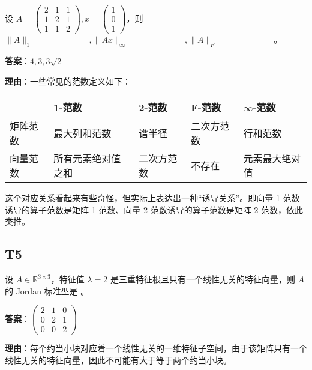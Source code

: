 \documentclass{article}
\begin{document}
\par 设 $A=\begin{pmatrix}
	2 & 1 & 1\\
	1 & 2 & 1\\
	1 & 1 & 2
\end{pmatrix}, x=\begin{pmatrix}
	1\\0\\1
\end{pmatrix}$，则 $\|A\|_1=\underline{\phantom{empty\_space}}, \|Ax\|_{\infty}=\underline{\phantom{empty\_space}}, \|A\|_F=\underline{\phantom{empty\_space}}$。

\par \textbf{答案}：$4, 3, 3\sqrt 2$

\par \textbf{理由}：一些常见的范数定义如下：

\begin{tabularx}{\linewidth}{|X|X|X|X|X|} 
	\hline
	 & 1-范数 & 2-范数 & F-范数 & $\infty$-范数 \\ 
	\hline
	矩阵范数 & 最大列和范数 & 谱半径 & 二次方范数 & 行和范数 \\ 
	\hline
	向量范数 & 所有元素绝对值之和 & 二次方范数 & 不存在 & 元素最大绝对值 \\ 
	\hline
\end{tabularx}

\par 这个对应关系看起来有些奇怪，但实际上表达出一种“诱导关系”。即向量 1-范数 诱导的算子范数是矩阵 1-范数、向量 2-范数诱导的算子范数是矩阵 2-范数，依此类推。

\subsection{T5}

\par 设 $A\in \mathbb R^{3\times 3}$，特征值 $\lambda=2$ 是三重特征根且只有一个线性无关的特征向量，则 $A$ 的 Jordan 标准型是 \underline{\phantom{empty\_space}}。

\par\textbf{答案}：$\begin{pmatrix}
	2 & 1 & 0\\
	0 & 2 & 1\\
	0 & 0 & 2
\end{pmatrix}$

\par \textbf{理由}：每个约当小块对应着一个线性无关的一维特征子空间，由于该矩阵只有一个线性无关的特征向量，因此不可能有大于等于两个约当小块。
\end{document}
